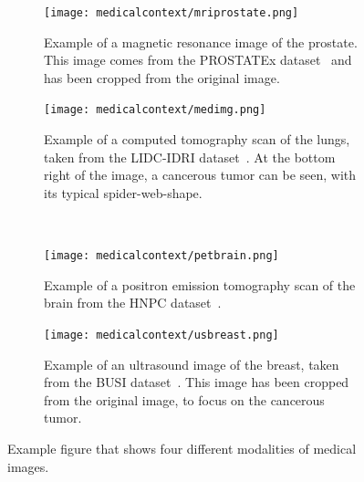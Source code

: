 \begin{figure}[t!]
     \centering
     \begin{subfigure}[t]{0.49\textwidth}
        \centering
        \texttt{[image: medicalcontext/mriprostate.png]}
        \caption[Prostate magnetic resonance image]{Example of a magnetic resonance image of the prostate. This image comes from the PROSTATEx dataset~\cite{armato_prostatex_2018} and has been cropped from the original image.}
        \label{fig:mriprostate}
     \end{subfigure}
     \hfill
     \begin{subfigure}[t]{0.49\textwidth}
        \centering
        \texttt{[image: medicalcontext/medimg.png]}
        \caption[Lungs computed tomography scan]{Example of a computed tomography scan of the lungs, taken from the LIDC-IDRI dataset~\cite{armato_data_2015}. At the bottom right of the image, a cancerous tumor can be seen, with its typical spider-web-shape.}
        \label{fig:ctlung}
     \end{subfigure}
     \\
     \begin{subfigure}[t]{0.49\textwidth}
        \centering
        \texttt{[image: medicalcontext/petbrain.png]}
        \caption[Positron emission tomography scan of the brain]{Example of a positron emission tomography scan of the brain from the HNPC dataset~\cite{vallieres_data_2017}.}
        \label{fig:petbrain}
     \end{subfigure}
     \hfill
     \begin{subfigure}[t]{0.49\textwidth}
        \centering
        \texttt{[image: medicalcontext/usbreast.png]}
        \caption[Breast ultrasound]{Example of an ultrasound image of the breast, taken from the BUSI dataset~\cite{al-dhabyani_dataset_2020}. This image has been cropped from the original image, to focus on the cancerous tumor.}
        \label{fig:usbreast}
     \end{subfigure}
        \caption[Four different medical images modalities]{Example figure that shows four different modalities of medical images.}
        \label{fig:segmaskimg}
\end{figure}


